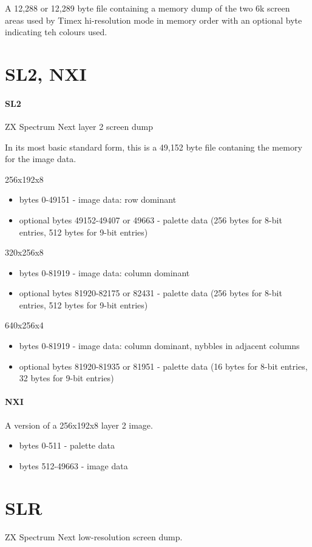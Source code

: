 A 12,288 or 12,289 byte file containing a memory dump of the two 6k
screen areas used by Timex hi-resolution mode in memory order with an
optional byte indicating teh colours used.
\section{SL2, NXI}
\paragraph{SL2}
ZX Spectrum Next layer 2 screen dump

In its most basic standard form, this is a 49,152 byte file contaning
the memory for the image data. 

256x192x8
\begin{itemize}
\item bytes 0-49151 - image data: row dominant
\item optional bytes 49152-49407 or 49663 - palette data (256 bytes
  for 8-bit entries, 512 bytes for 9-bit entries)
\end{itemize}
320x256x8
\begin{itemize}
\item bytes 0-81919 - image data: column dominant
\item optional bytes 81920-82175 or 82431 - palette data (256 bytes
  for 8-bit entries, 512 bytes for 9-bit entries)
\end{itemize}
640x256x4
\begin{itemize}
\item bytes 0-81919 - image data: column dominant, nybbles in adjacent columns
\item optional bytes 81920-81935 or 81951 - palette data (16 bytes for
  8-bit entries, 32 bytes for 9-bit entries)
\end{itemize}

\paragraph{NXI}
A version of a 256x192x8 layer 2 image.
\begin{itemize}
\item bytes 0-511 - palette data
\item bytes 512-49663 - image data
\end{itemize}
\section{SLR}
ZX Spectrum Next low-resolution screen dump.

